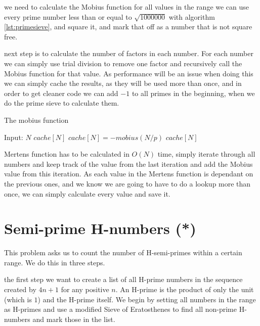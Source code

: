 \documentclass[11pt,a4paper,twoside]{article}
\begin{document}
 we need to calculate the Mobius function for all values in the
range we can use every prime number less than or equal to $\sqrt{1000000}$ with
algorithm \ref{lst:primesieve}, and square it, and mark that off as a number
that is not square free.

 next step is to calculate the number of factors in each number.
For each number we can simply use trial division to remove one factor and
recursively call the Mobius function for that value. As performance will be an
issue when doing this we can simply cache the results, as they will be used
more than once, and in order to get cleaner code we can add $-1$ to all primes
in the beginning, when we do the prime sieve to calculate them.

\begin{algorithm}
    \label{mobius}
    \caption{The mobius function}
    \begin{algorithmic}
        \REQUIRE Input: $N$
            \RETURN $cache[N]$
        \ENDIF
                \STATE $cache[N] = - mobius(N/p)$
                \RETURN $cache[N]$
            \ENDIF
        \ENDFOR
    \end{algorithmic}
\end{algorithm}

 Mertens function has to be calculated in $O(N)$ time, simply
iterate through all numbers and keep track of the value from the last iteration
and add the Mobius value from this iteration. As each value in the Mertens
function is dependant on the previous ones, and we know we are going to have to
do a lookup more than once, we can simply calculate every value and save it.


\section{Semi-prime H-numbers (*)}

This problem asks us to count the number of H-semi-primes within a certain 
range. We do this in three steps.

 the first step we want to create a list of all H-prime numbers in
the sequence created by $4n + 1$ for any positive $n$. An H-prime is the
product of only the unit (which is $1$) and the H-prime itself. We begin by
setting all numbers in the range as H-primes and use a modified Sieve of
Eratosthenes to find all non-prime H-numbers and mark those in the list.
\end{document}
